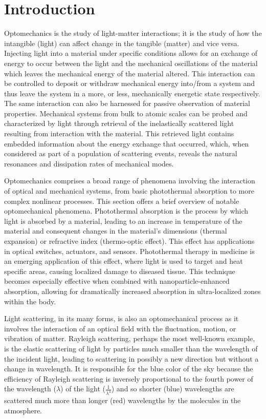 \chapter{Introduction}
\label{ch:Introduction}
\acresetall

Optomechanics is the study of light-matter interactions; it is the study of how the intangible (light) can affect change in the tangible (matter) and vice versa. Injecting light into a material under specific conditions allows for an exchange of energy to occur between the light and the mechanical oscillations of the material which leaves the mechanical energy of the material altered. This interaction can be controlled to deposit or withdraw mechanical energy into/from a system and thus leave the system in a more, or less, mechanically energetic state respectively. The same interaction can also be harnessed for passive observation of material properties. Mechanical systems from bulk to atomic scales can be probed and characterized by light through retrieval of the inelastically scattered light resulting from interaction with the material. This retrieved light contains embedded information about the energy exchange that occurred, which, when considered as part of a population of scattering events, reveals the natural resonances and dissipation rates of mechanical modes.

Optomechanics comprises a broad range of phenomena involving the interaction of optical and mechanical systems, from basic photothermal absorption to more complex nonlinear processes. This section offers a brief overview of notable optomechanical phenomena. Photothermal absorption is the process by which light is absorbed by a material, leading to an increase in temperature of the material and consequent changes in the material's dimensions (thermal expansion) or refractive index (thermo-optic effect). This effect has applications in optical switches, actuators, and sensors. \cite{boccara1980thermo, sutar2024design} Photothermal therapy in medicine is an emerging application of this effect, where light is used to target and heat specific areas, causing localized damage to diseased tissue\cite{hirsch2003nanoshell}. This technique becomes especially effective when combined with nanoparticle-enhanced absorption, allowing for dramatically increased absorption in ultra-localized zones within the body. \cite{johnson2018hybridization}

Light scattering, in its many forms, is also an optomechanical process as it involves the interaction of an optical field with the fluctuation, motion, or vibration of matter. Rayleigh scattering, perhaps the most well-known example, is the elastic scattering of light by particles much smaller than the wavelength of the incident light, leading to scattering in possibly a new direction but without a change in wavelength. It is responsible for the blue color of the sky because the efficiency of Rayleigh scattering is inversely proportional to the fourth power of the wavelength (\(\lambda\)) of the light (\(\frac{1}{\lambda^{4}}\)) and so shorter (blue) wavelengths are scattered much more than longer (red) wavelengths by the molecules in the atmosphere.\cite{rayleigh1871light}

